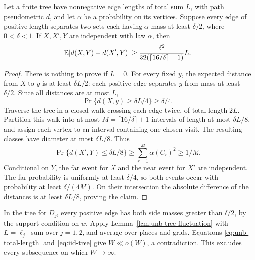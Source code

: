 \begin{lemma}\label{lem:unb-tree-fluctuation}
Let a finite tree have nonnegative edge lengths of total sum $L$,
with path pseudometric $d$, and let $\alpha$ be a probability on its
vertices. Suppose every edge of
positive length separates two sets each having $\alpha$-mass at least
$\delta/2$, where $0<\delta<1$. If $X,X',Y$ are independent with
law $\alpha$, then
\[
 \mathbb E|d(X,Y)-d(X',Y)|\ge
 \frac{\delta^2}{32(\lceil16/\delta\rceil+1)}L.
\]
\end{lemma}

\begin{proof}
There is nothing to prove if $L=0$. For every fixed $y$, the expected
distance from $X$ to $y$ is at least $\delta L/2$: each positive
edge separates $y$ from mass at least $\delta/2$. Since all distances
are at most $L$,
\[
 \Pr\{d(X,y)\ge\delta L/4\}\ge\delta/4.
\]
Traverse the tree in a closed walk crossing each edge twice, of total
length $2L$. Partition this walk into at most
$M=\lceil16/\delta\rceil+1$ intervals of length at most $\delta L/8$,
and assign each vertex to an interval containing one chosen visit.
The resulting classes have diameter at most $\delta L/8$. Thus
\[
 \Pr\{d(X',Y)\le\delta L/8\}
 \ge\sum_{r=1}^M\alpha(C_r)^2\ge1/M.
\]
Conditional on $Y$, the far event for $X$ and the near event for $X'$
are independent. The far probability is uniformly at least $\delta/4$,
so both events occur with probability at least $\delta/(4M)$.
On their intersection the absolute difference of the distances is
at least $\delta L/8$, proving the claim.
\end{proof}

In the tree for $D_j$, every positive edge has both side masses greater
than $\delta/2$, by the support condition on $w$. Apply
Lemma~\ref{lem:unb-tree-fluctuation} with $L=\ell_j$, sum over
$j=1,2$, and average over places and grids. Equations
\eqref{eq:unb-total-length} and~\eqref{eq:iid-tree} give
$W\ll o(W)$, a contradiction. This excludes every subsequence on
which $W\to\infty$.
